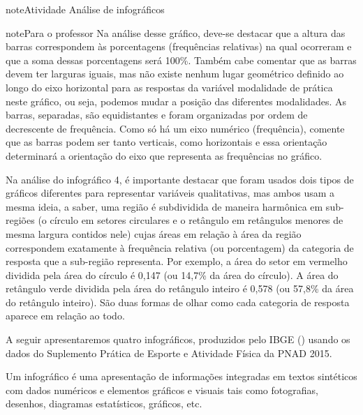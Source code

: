 \begin{sphinxadmonition}{note}{Atividade}{ Análise de infográficos}
\begin{sphinxadmonition}{note}{Para o professor}
Na análise desse gráfico, deve-se destacar que a altura das barras correspondem às porcentagens (frequências relativas) na qual ocorreram e que a soma dessas porcentagens será 100\%.  Também cabe comentar que as barras devem ter larguras iguais, mas não existe nenhum lugar geométrico definido ao longo do eixo horizontal para as respostas da variável modalidade de prática neste gráfico, ou seja, podemos mudar a posição das diferentes modalidades. As barras, separadas, são equidistantes e foram organizadas por ordem de decrescente de frequência. Como só há um eixo numérico (frequência), comente que as barras podem ser tanto verticais, como horizontais e essa orientação determinará a orientação do eixo que representa as frequências no gráfico.


Na análise do infográfico 4, é importante destacar que foram usados dois tipos de gráficos diferentes  para representar variáveis qualitativas, mas ambos usam a mesma ideia, a saber, uma região é subdividida de maneira harmônica em sub-regiões (o círculo em setores circulares e o retângulo em retângulos menores de mesma largura contidos nele) cujas áreas em relação à área da região correspondem exatamente à frequência relativa (ou porcentagem) da categoria de resposta que a sub-região representa. Por exemplo, a área do setor em vermelho dividida pela área do círculo é 0,147 (ou 14,7\% da área do círculo). A área do retângulo verde dividida pela área do retângulo inteiro é 0,578 (ou 57,8\% da área do retângulo inteiro).  São duas formas de olhar como cada categoria de resposta aparece em relação ao todo.
\end{sphinxadmonition}

A seguir apresentaremos quatro infográficos, produzidos pelo IBGE () usando os dados do Suplemento Prática de Esporte e Atividade Física da PNAD 2015.

Um infográfico é uma apresentação de informações integradas em textos sintéticos com dados numéricos e elementos gráficos e visuais tais como fotografias, desenhos, diagramas estatísticos, gráficos, etc.

\begin{figure}[H]
\centering
\capstart


\end{figure}
\end{sphinxadmonition}
